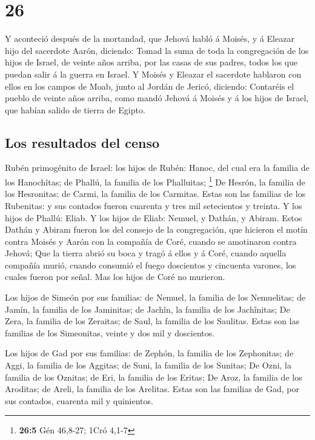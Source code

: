 \hypertarget{section-25}{%
\section{26}\label{section-25}}

 Y aconteció después de la mortandad, que Jehová habló á
Moisés, y á Eleazar hijo del sacerdote Aarón, diciendo: 
Tomad la suma de toda la congregación de los hijos de Israel, de veinte
años arriba, por las casas de sus padres, todos los que puedan salir á
la guerra en Israel.  Y Moisés y Eleazar el sacerdote
hablaron con ellos en los campos de Moab, junto al Jordán de Jericó,
diciendo:  Contaréis el pueblo de veinte años arriba, como
mandó Jehová á Moisés y á los hijos de Israel, que habían salido de
tierra de Egipto.

\hypertarget{los-resultados-del-censo-1}{%
\subsection{Los resultados del censo}\label{los-resultados-del-censo-1}}

 Rubén primogénito de Israel: los hijos de Rubén: Hanoc, del
cual era la familia de los Hanochîtas; de Phallú, la familia de los
Phalluitas; \footnote{\textbf{26:5} Gén 46,8-27; 1Cró 4,1-7}
 De Hesrón, la familia de los Hesronitas; de Carmi, la
familia de los Carmitas.  Estas son las familias de los
Rubenitas: y sus contados fueron cuarenta y tres mil setecientos y
treinta.  Y los hijos de Phallú: Eliab.  Y los
hijos de Eliab: Nemuel, y Dathán, y Abiram. Estos Dathán y Abiram fueron
los del consejo de la congregación, que hicieron el motín contra Moisés
y Aarón con la compañía de Coré, cuando se amotinaron contra Jehová;
 Que la tierra abrió su boca y tragó á ellos y á Coré,
cuando aquella compañía murió, cuando consumió el fuego doscientos y
cincuenta varones, los cuales fueron por señal.  Mas los
hijos de Coré no murieron.

 Los hijos de Simeón por sus familias: de Nemuel, la
familia de los Nemuelitas; de Jamín, la familia de los Jaminitas; de
Jachîn, la familia de los Jachînitas;  De Zera, la familia
de los Zeraitas; de Saul, la familia de los Saulitas. 
Estas son las familias de los Simeonitas, veinte y dos mil y doscientos.

 Los hijos de Gad por sus familias: de Zephón, la familia
de los Zephonitas; de Aggi, la familia de los Aggitas; de Suni, la
familia de los Sunitas;  De Ozni, la familia de los
Oznitas; de Eri, la familia de los Eritas;  De Aroz, la
familia de los Aroditas; de Areli, la familia de los Arelitas.
 Estas son las familias de Gad, por sus contados, cuarenta
mil y quinientos.


